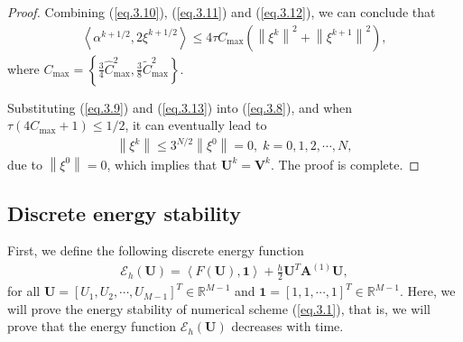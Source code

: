 \documentclass{siamart171218}
\numberwithin{theorem}{section}
\numberwithin{equation}{section}
\begin{document}
\begin{proof}
Combining (\ref{eq.3.10}), (\ref{eq.3.11}) and (\ref{eq.3.12}), we can conclude that
\begin{equation}\label{eq.3.13}
\begin{aligned}\displaystyle
\left\langle\alpha^{k+1/2},2\xi^{k+1/2}\right\rangle
\leq4\tau C_{\max}\left(\left\|\xi^{k}\right\|^2+\left\|\xi^{k+1}\right\|^2\right),
\end{aligned}
\end{equation}
where $C_{\max}=\left\{\frac{3}{4}
\hat{C}_{\max}^2,\frac{3}{8}\tilde{C}_{\max}^2\right\}$.

Substituting (\ref{eq.3.9}) and (\ref{eq.3.13}) into (\ref{eq.3.8}), and when
$\tau\left(4 C_{\max}+1\right)\leq1/2$,
 it can eventually lead to
\begin{equation*}
\begin{aligned}\displaystyle
\left\|\xi^{k}\right\|\leq3^{N/2}\left\|\xi^{0}\right\|=0,\;k=0,1,2,\cdots,N,
\end{aligned}
\end{equation*}
due to $\left\|\xi^{0}\right\|=0$,  which implies that $\mathbf{U}^k=\mathbf{V}^k$.
The proof is complete.
\end{proof}

\subsection{Discrete energy stability}
First, we define the following discrete energy function
 \begin{equation}\label{eq.3.18}
\begin{aligned}\displaystyle
{\mathcal{E}}_h\left(\mathbf{U}\right)=\left<
F\left(\mathbf{U}\right),\mathbf{1}\right>
+\frac{h}{2}\mathbf{U}^T \mathbf{A}^{(1)}\mathbf{U},
\end{aligned}
\end{equation}
for all $\mathbf{U}=\left[U_1,U_2,\cdots,U_{M-1}\right]^T\in \mathds{R}^{M-1}$ and
$\mathbf{1}=\left[1,1,\cdots,1\right]^T\in \mathds{R}^{M-1}$.
Here, we will prove the
energy stability of numerical scheme (\ref{eq.3.1}), that is, we will prove that the
energy function ${\mathcal{E}}_h\left(\mathbf{U}\right)$ decreases with time.
\end{document}
